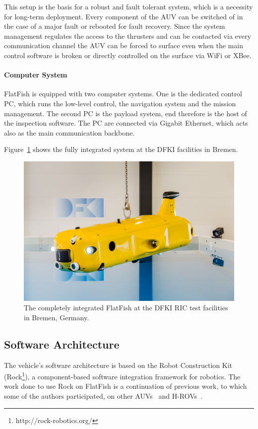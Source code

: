 \documentclass[conference]{IEEEtran}
\begin{document}
This setup is the basis for a robust and fault tolerant system, which is a necessity for 
long-term deployment. Every component of the AUV can be switched of in the case of a 
major fault or rebooted for fault recovery. Since the system management regulates the 
access to the thrusters and can be contacted via every communication channel the AUV 
can be forced to surface even when the main control software is broken or directly 
controlled on the surface via WiFi or XBee.

\paragraph{\textbf{Computer System}} FlatFish is equipped with two computer systems. 
One is the dedicated control PC, which runs the low-level control, the navigation system 
and the mission management. The second PC is the payload system, end therefore is the 
host of the inspection software. The PC are connected via Gigabit Ethernet, which acts also 
as the main communication backbone.

Figure~\ref{fig:flatfish1} shows the fully integrated system at the DFKI facilities in Bremen.
\begin{figure}[!t]
	\centering
	\includegraphics[width=0.9\columnwidth]{FlatFish-1.jpg}
	\caption{The completely integrated FlatFish at the DFKI RIC test facilities in Bremen, 
	Germany.}
	\label{fig:flatfish1}
\end{figure}


\subsection{Software Architecture}

The vehicle's software architecture is based on the Robot Construction Kit
(Rock\footnote{http://rock-robotics.org/}), a component-based software integration
framework for robotics. The work done to use Rock on FlatFish is a continuation of
previous work, to which some of the authors participated, on other AUVs~\cite{albiez2010}
and H-ROVs~\cite{meinecke2013}.
\end{document}
